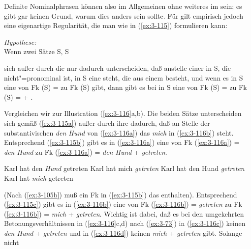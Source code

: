 \documentclass[output=paper]{langsci/langscibook}
\begin{document}
Definite Nominalphrasen können also im Allgemeinen ohne weiteres im 
sein; es gibt gar keinen Grund, warum dies anders sein sollte. Für
 gilt empirisch jedoch eine eigenartige Regularität,
die man wie in (\ref{ex:3-115}) formulieren kann:
\begin{exe}
\ex
\label{ex:3-115}
\textit{Hypothese:}\\
Wenn zwei Sätze S, S
\begin{xlist}
\ex
\label{ex:3-115a}
sich außer durch die  nur dadurch unterscheiden, daß anstelle
einer  in S, die nicht"=pronominal ist, in S eine  steht,
die aus einem  besteht, und wenn es
\ex
\label{ex:3-115b}
in S eine  von Fk (S) =  zu Fk
(S) gibt, dann gibt es \ex
\label{ex:3-115c}
bei  in S eine  von Fk (S)
=  zu Fk (S) =  + .
\end{xlist}
\end{exe}
Vergleichen wir zur Illustration (\ref{ex:3-116}a,b). Die beiden Sätze
unterscheiden sich gemäß (\ref{ex:3-115a}) außer durch ihre  dadurch,
daß an Stelle der substantivischen  \textit{den Hund} von (\ref{ex:3-116a}) das
 \textit{mich} in (\ref{ex:3-116b}) steht. Entsprechend (\ref{ex:3-115b}) gibt es
in (\ref{ex:3-116a}) eine  von Fk (\ref{ex:3-116a}) = \textit{den Hund} zu Fk
(\ref{ex:3-116a}) = \textit{den Hund} + \textit{getreten}.
\begin{exe}
\ex
\label{ex:3-116}
\begin{xlist}
\ex
\label{ex:3-116a}
Karl hat den \textit{Hund} getreten
\ex
\label{ex:3-116b}
Karl hat mich \textit{getreten}
\ex
\label{ex:3-116c}
Karl hat den Hund \textit{getreten}
\ex
\label{ex:3-116d}
Karl hat \textit{mich} getreten
\end{xlist}
\end{exe}
(Nach (\ref{ex:3-105b}) muß ein Fk in (\ref{ex:3-115b}) das 
enthalten). Entsprechend (\ref{ex:3-115c}) gibt es in (\ref{ex:3-116b}) eine
 von Fk (\ref{ex:3-116b}) = \textit{getreten} zu Fk (\ref{ex:3-116b})
= \textit{mich} + \textit{getreten}. Wichtig ist dabei, daß es bei den umgekehrten Betonungsverhältnissen in (\ref{ex:3-116}c,d) nach (\ref{ex:3-73}) in (\ref{ex:3-116c}) keinen  \textit{den Hund} + \textit{getreten} und in (\ref{ex:3-116d}) keinen  \textit{mich} + \textit{getreten} gibt. Solange nicht
\end{document}
